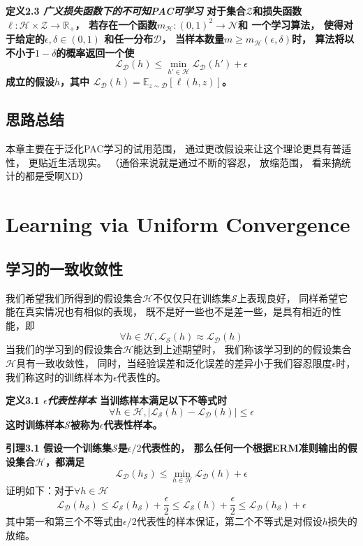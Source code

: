 \documentclass[UTF8]{ctexart}
\begin{document}
\textbf{
定义2.3 
\textit{广义损失函数下的不可知PAC可学习}
对于集合$\mathcal{Z}$和损失函数
$\ell:\mathcal{H}\times\mathcal{Z}\rightarrow\mathbb{R}_{+}$，
若存在一个函数$m_{\mathcal{H}}:{(0,1)}^2\rightarrow\mathcal{N}$和
一个学习算法，
使得对于给定的$\epsilon,\delta\in(0,1)$
和任一分布$\mathcal{D}$，
当样本数量$m\geq m_{\mathcal{H}}(\epsilon,\delta)$时，
算法将以不小于$1-\delta$的概率返回一个使
$$
\mathcal{L}_{\mathcal{D}}(h)\leq
\min_{h'\in\mathcal{H}}\mathcal{L}_{\mathcal{D}}(h')+\epsilon
$$
成立的假设$h$，其中
$\mathcal{L}_{\mathcal{D}}(h)=\mathbb{E}_{z\sim\mathcal{D}}[\ell(h,z)]$。
}

\subsection{思路总结}
本章主要在于泛化PAC学习的试用范围，
通过更改假设来让这个理论更具有普适性，
更贴近生活现实。
（通俗来说就是通过不断的容忍，
放缩范围，
看来搞统计的都是受啊XD）

\newpage

%
%

\section{Learning via Uniform Convergence}
\subsection{学习的一致收敛性}
我们希望我们所得到的假设集合$\mathcal{H}$不仅仅只在训练集$\mathcal{S}$上表现良好，
同样希望它能在真实情况也有相似的表现，
既不是好一些也不是差一些，是具有相近的性能，即
$$
\forall h\in\mathcal{H}, 
\mathcal{L}_{\mathcal{S}}(h)\approx \mathcal{L}_{\mathcal{D}}(h)
$$
当我们的学习到的假设集合$\mathcal{H}$能达到上述期望时，
我们称该学习到的的假设集合$\mathcal{H}$具有一致收敛性，
同时，当经验误差和泛化误差的差异小于我们容忍限度$\epsilon$时，
我们称这时的训练样本为$\epsilon$代表性的。

\textbf{
定义3.1 
\textit{$\epsilon$代表性样本}
当训练样本满足以下不等式时
$$
\forall h\in \mathcal{H},
|\mathcal{L}_{\mathcal{S}}(h)-\mathcal{L}_{\mathcal{D}}(h)|\leq \epsilon
$$
这时训练样本$\mathcal{S}$被称为$\epsilon$代表性样本。
}

\textbf{
引理3.1 
假设一个训练集$\mathcal{S}$是$\epsilon/2$代表性的，
那么任何一个根据ERM准则输出的假设集合$\mathcal{H}$，都满足
$$
\mathcal{L}_{\mathcal{D}}(h_{\mathcal{S}})\leq
\min_{h\in\mathcal{H}}\mathcal{L}_{\mathcal{D}}(h)+\epsilon
$$
}
证明如下：对于$\forall h\in\mathcal{H}$
$$
\mathcal{L}_{\mathcal{D}}(h_{\mathcal{S}})\leq
\mathcal{L}_{\mathcal{S}}(h_{\mathcal{S}})+\frac{\epsilon}{2}\leq
\mathcal{L}_{\mathcal{S}}(h)+\frac{\epsilon}{2}\leq
\mathcal{L}_{\mathcal{D}}(h_{\mathcal{S}})+\epsilon
$$
其中第一和第三个不等式由$\epsilon/2$代表性的样本保证，第二个不等式是对假设$h$损失的放缩。
\end{document}
